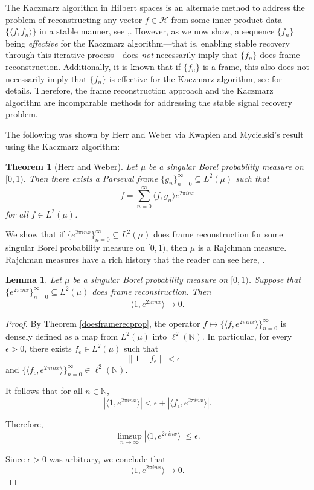 \documentclass[11pt]{amsart}
\newtheorem*{thm*}{Theorem}
\newtheorem{lem}[thm]{Lemma}
\theoremstyle{definition}
\numberwithin{equation}{section}
\begin{document}
The Kaczmarz algorithm in Hilbert spaces is an alternate method to address the problem of reconstructing any vector \( f \in \mathcal{H} \) from some inner product data $\{\langle f, f_n \rangle \}$ in a stable manner, see \cite{Haller2005Kaczmarz},\cite{Kwapien2001Kaczmarz}. However, as we now show, a sequence \( \{f_n\} \) being \emph{effective} for the Kaczmarz algorithm—that is, enabling stable recovery through this iterative process—does \emph{not} necessarily imply that \( \{f_n\} \) does frame reconstruction. Additionally, it is known that if \( \{f_n\} \) is a frame, this also does not necessarily imply that \( \{f_n\} \) is effective for the Kaczmarz algorithm, see \cite{Czaja2013Kaczmarz} for details. Therefore, the frame reconstruction approach and the Kaczmarz algorithm are incomparable methods for addressing the stable signal recovery problem.

The following was shown by Herr and Weber \cite{Herr2017Fourier} via Kwapien and Mycielski's result \cite{Kwapien2001Kaczmarz} using the Kaczmarz algorithm:

\begin{thm*}[Herr and Weber]
Let $\mu$ be a singular Borel probability measure on $[0,1)$. Then there exists a Parseval frame $\{g_{n}\}_{n=0}^{\infty}\subseteq L^{2}(\mu)$ such that
$$f=\sum_{n=0}^{\infty}\langle f, g_{n}\rangle e^{2\pi i nx}$$ for all $f\in L^{2}(\mu)$.
\end{thm*}
We show that if $\{e^{2\pi i n x}\}_{n=0}^\infty \subseteq L^2(\mu)$ does frame reconstruction for some singular Borel probability measure on $[0,1)$, then $\mu$ is a Rajchman measure. Rajchman measures have a rich history that the reader can see here, \cite{Lyons1995Seventy}.
\begin{lem}
Let $\mu$ be a singular Borel probability measure on $[0,1)$. Suppose that
$
\{e^{2\pi i n x}\}_{n=0}^\infty \subseteq L^2(\mu)
$
does frame reconstruction. Then $$\langle 1, e^{2\pi i n x} \rangle \to 0.$$
\end{lem}
\begin{proof}
By Theorem \ref{doesframerecprop}, the operator
$
f \mapsto \{\langle f, e^{2\pi i n x} \rangle\}_{n=0}^\infty
$
is densely defined as a map from $L^2(\mu)$ into $\ell^2(\mathbb{N})$.
In particular, for every $\epsilon > 0$, there exists $f_{\epsilon} \in L^2(\mu)$ such that
$$
\|1 - f_{\epsilon}\| < \epsilon \quad$$and $ \{\langle f_{\epsilon}, e^{2\pi i n x} \rangle\}_{n=0}^\infty \in \ell^2(\mathbb{N}).
$

It follows that for all $n \in \mathbb{N}$,
\[
|\langle 1, e^{2\pi i n x} \rangle| < \epsilon + |\langle f_{\epsilon}, e^{2\pi i n x} \rangle|.
\]

Therefore,
\[
\limsup_{n \to \infty} |\langle 1, e^{2\pi i n x} \rangle| \leq \epsilon.
\]

Since $\epsilon > 0$ was arbitrary, we conclude that
\[
\langle 1, e^{2\pi i n x} \rangle \to 0.
\]
\end{proof}
\end{document}
